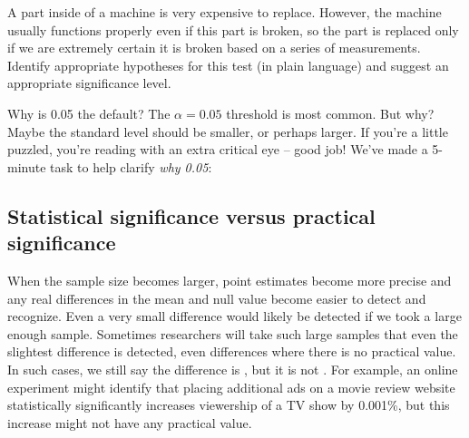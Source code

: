\begin{exercisewrap}
\begin{nexercise}
A part inside of a machine is very expensive to replace.
However, the machine usually functions properly even if
this part is broken, so the part is replaced only if we
are extremely certain it is broken based on a series of
measurements.
Identify appropriate hypotheses for this test
(in plain language) and suggest an appropriate significance
level.\footnotemark
\end{nexercise}
\end{exercisewrap}

\begin{onebox}{Why is 0.05 the default?}
  The $\alpha = 0.05$ threshold is most common. But why?
  Maybe the standard level should be smaller, or perhaps larger.
  If you're a little puzzled, you're reading with an
  extra critical eye -- good job!
  We've made a 5-minute task to help clarify \emph{why 0.05}:
  \begin{center}
  \end{center}
\end{onebox}




\subsection{Statistical significance versus practical significance}

When the sample size becomes larger,
point estimates become more precise and any real differences
in the mean and null value become easier to detect and recognize.
Even a very small difference would likely be detected if we took
a large enough sample.
Sometimes researchers will take such large samples that even
the slightest difference is detected, even differences where
there is no practical value.
In such cases, we still say the difference is
,
but it is not .
For example, an online experiment might identify that placing
additional ads on a movie review website statistically
significantly increases viewership of a TV show by 0.001\%,
but this increase might not have any practical value.

